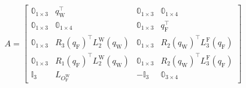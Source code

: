 \begin{align}
\label{eq:A_contraint}
    A = \begin{bmatrix}
            \mathbb{0}_{1 \times 3} & q_{\text{W}}^\top & \mathbb{0}_{1 \times 3} & \mathbb{0}_{1 \times 4}\\
            \mathbb{0}_{1 \times 3} & \mathbb{0}_{1 \times 4} & \mathbb{0}_{1 \times 3} & q_{\text{F}}^\top\\
            \mathbb{0}_{1 \times 3} & R_{3}(q_{\text{F}})^\top L_{2}^{\text{W}}( q_{\text{W}} ) & \mathbb{0}_{1 \times 3} & R_{2}(q_{\text{W}})^\top L_{3}^{\text{F}}( q_{\text{F}} ) \\
            \mathbb{0}_{1 \times 3} & R_{1}(q_{\text{F}})^\top L_{2}^{\text{W}}( q_{\text{W}} ) & \mathbb{0}_{1 \times 3} & R_{2}(q_{\text{W}})^\top L_{3}^{\text{F}}( q_{\text{F}} ) \\
            \mathbb{I}_{3} & L_{O_{\text{F}}^{\text{W}}} & -\mathbb{I}_{3} & \mathbb{0}_{3 \times 4}
        \end{bmatrix}
\end{align}

